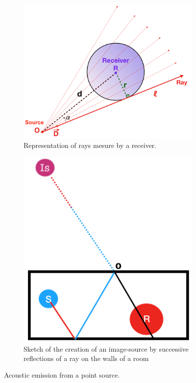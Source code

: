 \documentclass[AMA,STIX1COL]{WileyNJD-v2}
\begin{document}
\begin{figure}[b]
	\centering

	
	\begin{subfigure}{0.5\textwidth}
		\includegraphics[width=\textwidth]{rays}
		\caption{Representation of rays mesure by a receiver.}
		\label{rays}
	\end{subfigure}	
	\qquad
		\begin{subfigure}{0.4\textwidth}
	\includegraphics[width=\linewidth]{schema_SI}
	\caption{Sketch of the creation of an image-source by successive reflections of a ray on the walls of a room}
	\label{schema_SI}
	\end{subfigure}
	\caption{Acoustic emission from a point source.}
\end{figure}
\end{document}
